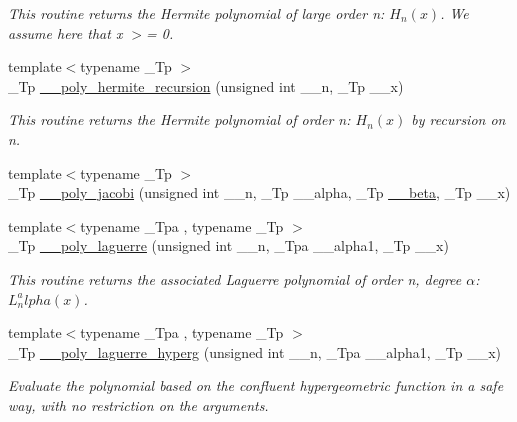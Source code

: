 \begin{DoxyCompactItemize}
\begin{DoxyCompactList}\small\item\em This routine returns the Hermite polynomial of large order n\+: $ H_n(x) $. We assume here that x $>$= 0. \end{DoxyCompactList}\item 
{\footnotesize template$<$typename \+\_\+\+Tp $>$ }\\\+\_\+\+Tp \hyperlink{namespacestd_1_1____detail_a4dbbb56aec75c28da046df01112ba2d0}{\+\_\+\+\_\+poly\+\_\+hermite\+\_\+recursion} (unsigned int \+\_\+\+\_\+n, \+\_\+\+Tp \+\_\+\+\_\+x)
\begin{DoxyCompactList}\small\item\em This routine returns the Hermite polynomial of order n\+: $ H_n(x) $ by recursion on n. \end{DoxyCompactList}\item 
{\footnotesize template$<$typename \+\_\+\+Tp $>$ }\\\+\_\+\+Tp \hyperlink{namespacestd_1_1____detail_a7fcc47c397903ac177380517e94153c6}{\+\_\+\+\_\+poly\+\_\+jacobi} (unsigned int \+\_\+\+\_\+n, \+\_\+\+Tp \+\_\+\+\_\+alpha, \+\_\+\+Tp \hyperlink{namespacestd_1_1____detail_a090d2f0920e0d208c467609b2a81d717}{\+\_\+\+\_\+beta}, \+\_\+\+Tp \+\_\+\+\_\+x)
\item 
{\footnotesize template$<$typename \+\_\+\+Tpa , typename \+\_\+\+Tp $>$ }\\\+\_\+\+Tp \hyperlink{namespacestd_1_1____detail_a76704115fd45b240802f4ccc433bb033}{\+\_\+\+\_\+poly\+\_\+laguerre} (unsigned int \+\_\+\+\_\+n, \+\_\+\+Tpa \+\_\+\+\_\+alpha1, \+\_\+\+Tp \+\_\+\+\_\+x)
\begin{DoxyCompactList}\small\item\em This routine returns the associated Laguerre polynomial of order n, degree $ \alpha $\+: $ L_n^alpha(x) $. \end{DoxyCompactList}\item 
{\footnotesize template$<$typename \+\_\+\+Tpa , typename \+\_\+\+Tp $>$ }\\\+\_\+\+Tp \hyperlink{namespacestd_1_1____detail_a1c817d7f5df1147829ad745176325cd6}{\+\_\+\+\_\+poly\+\_\+laguerre\+\_\+hyperg} (unsigned int \+\_\+\+\_\+n, \+\_\+\+Tpa \+\_\+\+\_\+alpha1, \+\_\+\+Tp \+\_\+\+\_\+x)
\begin{DoxyCompactList}\small\item\em Evaluate the polynomial based on the confluent hypergeometric function in a safe way, with no restriction on the arguments. \end{DoxyCompactList}\item 

\end{DoxyCompactItemize}
